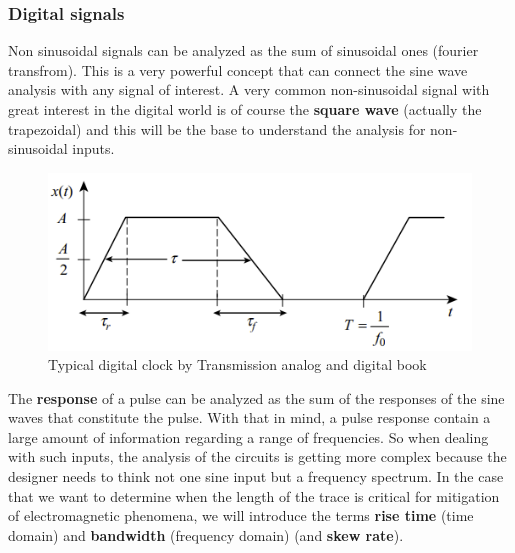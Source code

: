 \documentclass[12pt]{article}
\begin{document}
\subsubsection{Digital signals}

Non sinusoidal signals can be analyzed as the sum of sinusoidal ones (fourier transfrom). This is a very powerful concept that can connect the sine wave analysis with any signal of interest. A very common non-sinusoidal signal with great interest in the digital world is of course the \textbf{square wave} (actually the trapezoidal) and this will be the base to understand the analysis for non-sinusoidal inputs.

\begin{figure}[h!]
	\centering
	\includegraphics[keepaspectratio, width = \textwidth]{assets/clock_signal.png}
	\caption{Typical digital clock by Transmission analog and digital book}
\end{figure}


The \textbf{response} of a pulse can be analyzed as the sum of the responses of the sine waves that constitute the pulse. With that in mind, a pulse response contain a large amount of information regarding a range of frequencies. So when dealing with such inputs, the analysis of the circuits is getting more complex because the designer needs to think not one sine input but a frequency spectrum. In the case that we want to determine when the length of the trace is critical for mitigation of electromagnetic phenomena, we will introduce the terms \textbf{rise time} (time domain) and \textbf{bandwidth} (frequency domain) (and \textbf{skew rate}).
\end{document}

